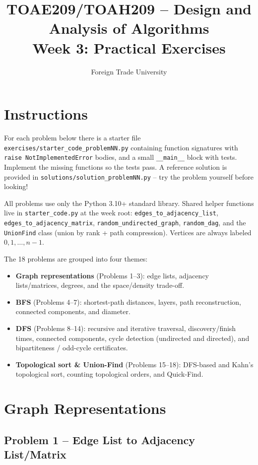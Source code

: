 \documentclass[11pt]{article}
\title{TOAE209/TOAH209 -- Design and Analysis of Algorithms\\[4pt]
\large Week 3: Practical Exercises}
\author{Foreign Trade University}
\date{}
\begin{document}
\maketitle

\section*{Instructions}

For each problem below there is a starter file
\texttt{exercises/starter\_code\_problemNN.py} containing function signatures with
\texttt{raise NotImplementedError} bodies, and a small \texttt{\_\_main\_\_} block with
tests. Implement the missing functions so the tests pass. A reference solution is
provided in \texttt{solutions/solution\_problemNN.py} -- try the problem yourself before
looking!

All problems use only the Python 3.10+ standard library. Shared helper functions live in
\texttt{starter\_code.py} at the week root: \texttt{edges\_to\_adjacency\_list},
\texttt{edges\_to\_adjacency\_matrix}, \texttt{random\_undirected\_graph},
\texttt{random\_dag}, and the \texttt{UnionFind} class (union by rank + path
compression). Vertices are always labeled $0, 1, \dots, n-1$.

The 18 problems are grouped into four themes:
\begin{itemize}
    \item \textbf{Graph representations} (Problems 1--3): edge lists, adjacency
    lists/matrices, degrees, and the space/density trade-off.
    \item \textbf{BFS} (Problems 4--7): shortest-path distances, layers, path
    reconstruction, connected components, and diameter.
    \item \textbf{DFS} (Problems 8--14): recursive and iterative traversal,
    discovery/finish times, connected components, cycle detection (undirected and
    directed), and bipartiteness / odd-cycle certificates.
    \item \textbf{Topological sort \& Union-Find} (Problems 15--18): DFS-based and
    Kahn's topological sort, counting topological orders, and Quick-Find.
\end{itemize}

\newpage
\section{Graph Representations}

\subsection*{Problem 1 -- Edge List to Adjacency List/Matrix}
\end{document}
